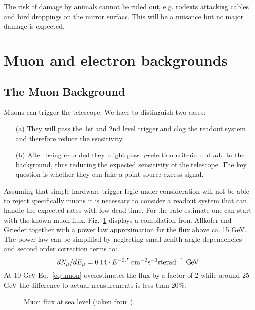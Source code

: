 The risk of damage by animals cannot be ruled out, e.g. rodents attacking
cables and bird droppings on the mirror surface. This will be a nuisance but
no major damage is expected.

\section{Muon and electron backgrounds}

\subsection{The Muon Background}


\medskip Muons can trigger the telescope. We have to distinguish two cases:

\begin{itemize}
\item[(a)]  They will pass the 1st and 2nd level trigger and
clog the readout system and therefore reduce the 
sensitivity.

\item[(b)]  After being recorded they might pass $\gamma $-selection
criteria and add to the background, thus reducing the expected sensitivity
of the telescope. The key question is whether they can fake a point source
excess signal.
\end{itemize}

Assuming that simple hardware trigger logic under consideration will not be
able to reject specifically muons it is necessary to consider a readout
system that can handle the expected rates with low dead time. For the rate
estimate one can start with the known muon flux. Fig.~\ref{fig-muon} displays a
compilation from Allkofer and Grieder together with a power law
approximation for the flux above ca. 15 GeV. The power law can be simplified
by neglecting small zenith angle dependencies and second order correction
terms to: 
\begin{equation}
dN_{\mu }/dE_{\mu }=0.14\cdot E^{-2.7}\ {\rm cm}^{-2}{\rm s}^{-1}{\rm sterad}%
^{-1}\ {\rm GeV}
\label{eq-muon}
\end{equation}
At 10 GeV Eq.~\ref{eq-muon} overestimates the flux by a factor of 2 while
around 25 GeV the difference to actual measurements is less than 20\%.

\begin{figure}[htb]
\leavevmode
\centering
\epsfxsize=8cm
\caption{Muon flux at sea level (taken from \cite{alkhofer:84}).}
\label{fig-muon}
\end{figure}

